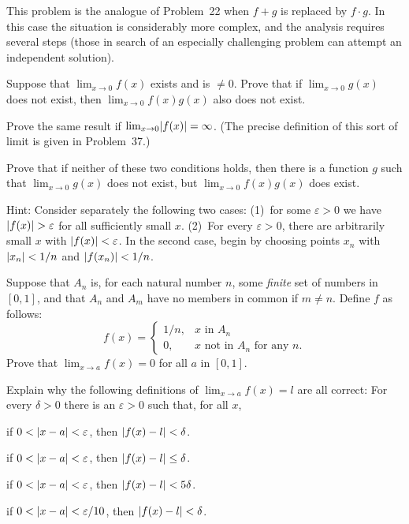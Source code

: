 This problem is the analogue of Problem~22 when $f+g$ is replaced by
$f\cdot g$. In this case the situation is considerably more complex, and the
analysis requires several steps (those in search of an especially challenging
problem can attempt an independent solution).
\begin{letters}
\item Suppose that $\lim_{x\to 0}f(x)$ exists and is $\neq 0$. Prove that if
$\lim_{x\to 0}g(x)$ does not exist, then $\lim_{x\to 0}f(x)g(x)$ also does
not exist.
\item Prove the same result if $\lim_{x\to 0}\lvert f(x)\rvert=\infty$. (The precise
definition of this sort of limit is given in Problem~37.)
\item Prove that if neither of these two conditions holds, then there is a
function $g$ such that $\lim_{x\to 0}g(x)$ does not exist, but
$\lim_{x\to 0}f(x)g(x)$ does exist.

Hint: Consider separately the following two cases: (1)~for some
$\varepsilon>0$ we have $\lvert f(x)\rvert>\varepsilon$ for all sufficiently small
$x$. (2)~For every $\varepsilon>0$, there are arbitrarily small $x$ with
$\lvert f(x)\rvert<\varepsilon$. In the second case, begin by choosing points $x_n$
with $\lvert x_n\rvert<1/n$ and $\lvert f(x_n)\rvert<1/n$.
\end{letters}

Suppose that $A_n$ is, for each natural number $n$, some \emph{finite} set of
numbers in $[0,1]$, and that $A_n$ and $A_m$ have no members in common if
$m\neq n$. Define $f$ as follows:
\[
f(x)=\begin{cases}
1/n, & x\text{ in }A_n\\
0, & x\text{ not in }A_n\text{ for any }n.
\end{cases}
\]
Prove that $\lim_{x\to a}f(x)=0$ for all $a$ in $[0,1]$.

Explain why the following definitions of $\lim_{x\to a}f(x)=l$ are all
correct: For every $\delta>0$ there is an $\varepsilon>0$ such that, for all
$x$,
\begin{romans}
\item if $0<\lvert x-a\rvert<\varepsilon$, then $\lvert f(x)-l\rvert<\delta$.
\item if $0<\lvert x-a\rvert<\varepsilon$, then $\lvert f(x)-l\rvert\leq\delta$.
\item if $0<\lvert x-a\rvert<\varepsilon$, then $\lvert f(x)-l\rvert<5\delta$.
\item if $0<\lvert x-a\rvert<\varepsilon/10$, then $\lvert f(x)-l\rvert<\delta$.
\end{romans}

